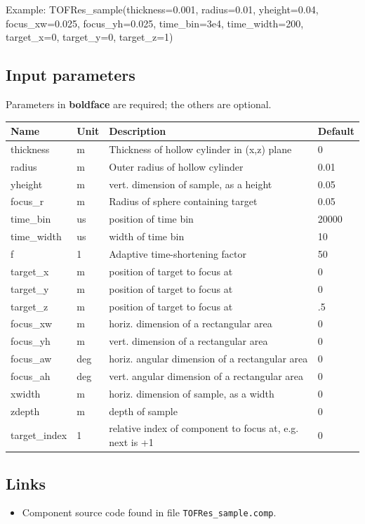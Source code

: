 Example: TOFRes\_sample(thickness=0.001, radius=0.01, yheight=0.04, focus\_xw=0.025, focus\_yh=0.025, time\_bin=3e4, time\_width=200, target\_x=0, target\_y=0, target\_z=1)

\subsection*{Input parameters}
Parameters in \textbf{boldface} are required; the others are optional.

\begin{longtable}{p{}p{}p{}p{}}
\toprule
\textbf{Name} & \textbf{Unit} & \textbf{Description} & \textbf{Default} \\
\midrule
\endhead
thickness & m & Thickness of hollow cylinder in (x,z) plane & 0 \\
radius & m & Outer radius of hollow cylinder & 0.01 \\
yheight & m & vert.  dimension of sample, as a height & 0.05 \\
focus\_r & m & Radius of sphere containing target & 0.05 \\
time\_bin & us & position of time bin & 20000 \\
time\_width & us & width of time bin & 10 \\
f & 1 & Adaptive time-shortening factor & 50 \\
target\_x & m & position of target to focus at & 0 \\
target\_y & m & position of target to focus at & 0 \\
target\_z & m & position of target to focus at & .5 \\
focus\_xw & m & horiz. dimension of a rectangular area & 0 \\
focus\_yh & m & vert.  dimension of a rectangular area & 0 \\
focus\_aw & deg & horiz. angular dimension of a rectangular area & 0 \\
focus\_ah & deg & vert.  angular dimension of a rectangular area & 0 \\
xwidth & m & horiz. dimension of sample, as a width & 0 \\
zdepth & m & depth of sample & 0 \\
target\_index & 1 & relative index of component to focus at, e.g. next is +1 & 0 \\
\bottomrule
\end{longtable}

\subsection*{Links}
\begin{itemize}
  \item Component source code found in file \texttt{TOFRes\_sample.comp}.
\end{itemize}

